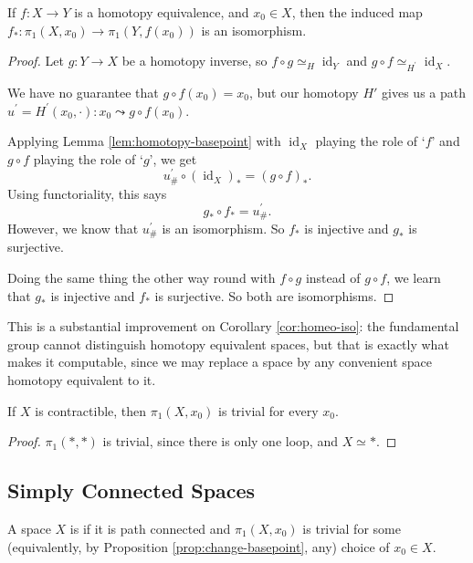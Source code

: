 \documentclass[a4paper]{scrartcl}
\newcommand{\id}{\operatorname{id}}
\begin{document}
\begin{theorem} \label{thm:he-iso}
	If $f: X \rightarrow Y$ is a homotopy equivalence, and $x_0 \in X$, then the induced map
	$f_*: \pi_1(X, x_0) \rightarrow \pi_1(Y, f(x_0))$ is an isomorphism.
\end{theorem}
\begin{proof}
	Let $g: Y \rightarrow X$ be a homotopy inverse, so $f \circ g \simeq_H \id_Y$ and $g \circ f \simeq_{H^{\prime}} \id_X$.

	We have no guarantee that $g \circ f(x_0)=x_0$, but our homotopy $H'$ gives us a path $u^{\prime}=H^{\prime}(x_0, \cdot): x_0 \leadsto g \circ f(x_0)$.

	Applying Lemma \ref{lem:homotopy-basepoint} with $\id_X$ playing the role of `$f$' and $g \circ f$ playing the role of `$g$', we get
	$$
	u_{\#}^{\prime} \circ(\id_X)_*=(g \circ f)_*.
	$$
	Using functoriality, this says
	$$
	g_* \circ f_*=u_{\#}^{\prime}.
	$$
	However, we know that $u_{\#}^{\prime}$ is an isomorphism. So $f_*$ is injective and $g_*$ is surjective.

	Doing the same thing the other way round with $f \circ g$ instead of $g \circ f$, we learn that $g_*$ is injective and $f_*$ is surjective. So both are isomorphisms.
\end{proof}

This is a substantial improvement on Corollary \ref{cor:homeo-iso}: the fundamental group
cannot distinguish homotopy equivalent spaces, but that is exactly what makes it
computable, since we may replace a space by any convenient space homotopy equivalent to
it.

\begin{corollary}
	If $X$ is contractible, then $\pi_1(X, x_0)$ is trivial for every $x_0$.
\end{corollary}
\begin{proof}
	$\pi_1(*, *)$ is trivial, since there is only one loop, and $X \simeq *$.
\end{proof}

\subsection{Simply Connected Spaces}

\begin{definition}
	A space $X$ is  if it is path connected and $\pi_1(X, x_0)$ is trivial for some (equivalently, by Proposition \ref{prop:change-basepoint}, any) choice of $x_0 \in X$.
\end{definition}
\end{document}
